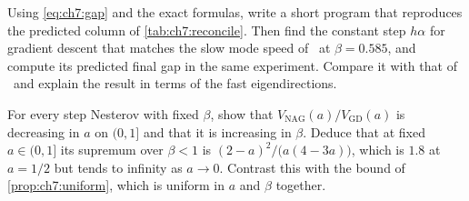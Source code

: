 \begin{exercise}
Using \eqref{eq:ch7:gap} and the exact formulas, write a short program that
reproduces the predicted column of \cref{tab:ch7:reconcile}. Then find the
constant step $h\alpha$ for gradient descent that matches the slow mode speed of
\smmdet\ at $\beta=0.585$, and compute its predicted final gap in the same
experiment. Compare it with that of \smmdet\ and explain the result in terms of the fast eigendirections.
\end{exercise}

\begin{exercise}
For every step Nesterov with fixed $\beta$, show that
$V_{\mathrm{NAG}}(a)/V_{\mathrm{GD}}(a)$ is decreasing in $a$ on $(0,1]$ and that it is increasing in $\beta$. Deduce that at fixed $a\in(0,1]$ its
supremum over $\beta<1$ is $(2-a)^2/\bigl(a(4-3a)\bigr)$, which is $1.8$ at
$a=1/2$ but tends to infinity as $a\to0$. Contrast this with the bound of
\cref{prop:ch7:uniform}, which is uniform in $a$ and $\beta$ together.
\end{exercise}
